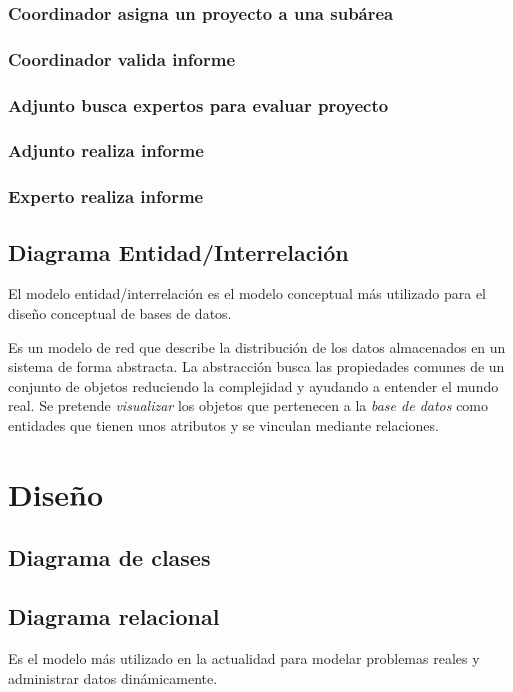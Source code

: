 \documentclass[11pt,a4paper,spanish,twoside]{book}
\begin{document}
\subsection{Coordinador asigna un proyecto a una subárea}

\subsection{Coordinador valida informe}

\subsection{Adjunto busca expertos para evaluar proyecto}

\subsection{Adjunto realiza informe}

\subsection{Experto realiza informe}

\section{Diagrama Entidad/Interrelación}
El modelo entidad/interrelación es el modelo conceptual más utilizado para el 
diseño conceptual de bases de datos.

Es un modelo de red que describe la distribución de los datos almacenados en un 
sistema de forma abstracta. La abstracción busca las propiedades comunes de un 
conjunto de objetos reduciendo la complejidad y ayudando a entender el mundo 
real. Se pretende \emph{visualizar} los objetos que pertenecen a la
\emph{base de datos} como entidades que tienen unos atributos y se vinculan
mediante relaciones.


\chapter{Diseño}

\section{Diagrama de clases}

\section{Diagrama relacional}
Es el modelo más utilizado en la actualidad para modelar problemas reales y 
administrar datos dinámicamente.
\end{document}
